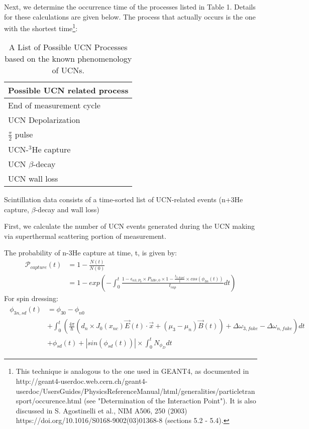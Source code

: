 Next, we determine the occurrence time of the processes listed in Table 1. Details for these calculations are given below. The process that actually occurs is the one with the shortest time\footnote{This technique is analogous to the one used in GEANT4, as documented in http://geant4-userdoc.web.cern.ch/geant4-userdoc/UsersGuides/PhysicsReferenceManual/html/generalities/particletransport/occurence.html (see "Determination of the Interaction Point").  It is also discussed in S. Agostinelli et al., NIM A506, 250 (2003) https://doi.org/10.1016/S0168-9002(03)01368-8 (sections 5.2 - 5.4).}:

\begin{table}[]
\centering
\caption{A List of Possible UCN Processes based on the known phenomenology of UCNs.}
\label{tab:my-table}
\begin{tabular}{@{}l@{}}
\toprule
Possible UCN related process \\ \midrule
End of measurement cycle \\
UCN Depolarization \\
$\frac{\pi}{2}$ pulse \\
UCN-$^{3}$He capture \\
UCN $\beta$-decay \\
UCN wall loss \\ \bottomrule
\end{tabular}
\end{table}














Scintillation data consists of a time-sorted list of UCN-related events (n+3He capture, $\beta$-decay and wall loss)

First, we calculate the number of UCN events generated during the UCN making via superthermal scattering portion of measurement.

The probability of n-3He capture at time, t, is given by:
\begin{equation}
\begin{split}
    \mathcal{P}_{capture}(t) & = 1- \frac{N(t)}{N(0)} \\
    & = 1 - exp \left ( -  \int_{0}^{t} \frac{1- \epsilon_{n3,P_0} \times P_{3He,0} \times 1 - \frac{t_{3,depol}}{t} \times cos(\phi_{3n}(t)) }{t_{cap}} dt   \right )    
\end{split}
\end{equation}
For spin dressing:
\begin{align}
\begin{split}
    \phi_{3n,sd}(t) & = \phi_{30} - \phi_{n0} \\
    & + \int_{0}^{t} \left( \frac{4 \pi}{\hbar} \left( d_{n} \times J_{0}(x_{nc})\Vec{E}(t) \cdot \Vec{x} + (\mu_3 - \mu_n) \Vec{B}(t) \right) + \Delta \omega_{3,fake} - \Delta \omega_{n,fake} \right) dt \\
    & + \phi_{sd}(t) + |sin(\phi_{sd}(t))| \times \int_{0}^{t} N_{\phi_{D}}dt
\end{split}
\end{align}

